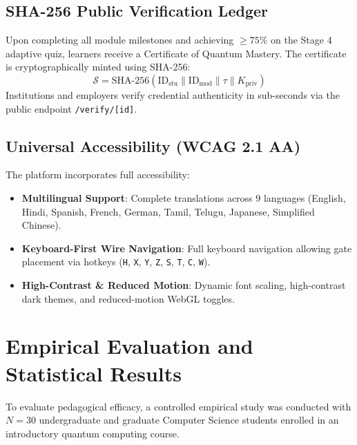 \documentclass[conference]{IEEEtran}
\begin{document}
\subsection{SHA-256 Public Verification Ledger}
Upon completing all module milestones and achieving $\ge 75\%$ on the Stage 4 adaptive quiz, learners receive a Certificate of Quantum Mastery. The certificate is cryptographically minted using SHA-256:
\begin{equation}
\mathcal{S} = \text{SHA-256}(\text{ID}_{\text{stu}} \parallel \text{ID}_{\text{mod}} \parallel \tau \parallel K_{\text{priv}})
\end{equation}
Institutions and employers verify credential authenticity in sub-seconds via the public endpoint \texttt{/verify/[id]}.

\subsection{Universal Accessibility (WCAG 2.1 AA)}
The platform incorporates full accessibility:
\begin{itemize}[leftmargin=*,itemsep=2pt]
    \item \textbf{Multilingual Support}: Complete translations across 9 languages (English, Hindi, Spanish, French, German, Tamil, Telugu, Japanese, Simplified Chinese).
    \item \textbf{Keyboard-First Wire Navigation}: Full keyboard navigation allowing gate placement via hotkeys (\texttt{H}, \texttt{X}, \texttt{Y}, \texttt{Z}, \texttt{S}, \texttt{T}, \texttt{C}, \texttt{W}).
    \item \textbf{High-Contrast \& Reduced Motion}: Dynamic font scaling, high-contrast dark themes, and reduced-motion WebGL toggles.
\end{itemize}

\section{Empirical Evaluation and Statistical Results}
\label{sec:evaluation}

To evaluate pedagogical efficacy, a controlled empirical study was conducted with $N=30$ undergraduate and graduate Computer Science students enrolled in an introductory quantum computing course.
\end{document}

